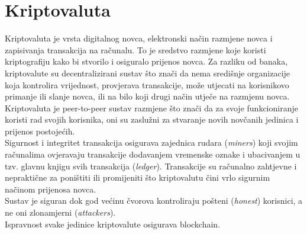 \documentclass[12pt]{article}
\begin{document}
\section{Kriptovaluta}
Kriptovaluta je vrsta digitalnog novca, elektronski način razmjene novca i zapisivanja transakcija na računalu. To je sredstvo razmjene koje koristi kriptografiju kako bi stvorilo i osiguralo prijenos novca. Za razliku od banaka, kriptovalute su decentralizirani sustav što znači da nema središnje organizacije koja kontrolira vrijednost, provjerava transakcije, može utjecati na korisnikovo primanje ili slanje novca, ili na bilo koji drugi način utječe na razmjenu novca. Kriptovaluta je peer-to-peer sustav razmjene što znači da za svoje funkcioniranje koristi rad svojih korisnika, oni su zaslužni za stvaranje novih novčanih jedinica i prijenos postojećih.\\
Sigurnost i integritet transakcija osigurava zajednica rudara (\textit{miners}) koji svojim računalima ovjeravaju transakcije dodavanjem vremenske oznake i ubacivanjem u tzv. glavnu knjigu svih transakcija (\textit{ledger}). Transakcije su računalno zahtjevne i nepraktične za poništiti ili promijeniti što kriptovalutu čini vrlo sigurnim načinom prijenosa novca.\cite{cryptocurrency} \\
Sustav je siguran dok god većinu čvorova kontroliraju pošteni (\textit{honest}) korisnici, a ne oni zlonamjerni (\textit{attackers}). \\
Ispravnost svake jedinice kriptovalute osigurava blockchain.
\end{document}
